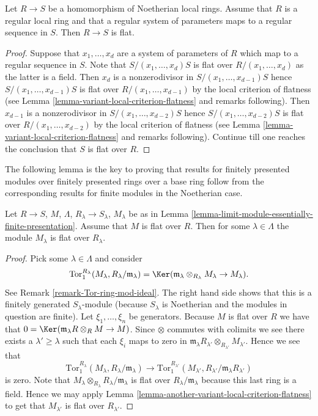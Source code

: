 \begin{lemma}
\label{lemma-flat-over-regular}
Let $R \to S$ be a homomorphism of Noetherian local rings.
Assume that $R$ is a regular local ring and that a regular system
of parameters maps to a regular sequence in $S$. Then $R \to S$
is flat.
\end{lemma}

\begin{proof}
Suppose that $x_1, \ldots, x_d$ are a system of parameters of $R$
which map to a regular sequence in $S$. Note that
$S/(x_1, \ldots, x_d)S$ is flat over $R/(x_1, \ldots, x_d)$
as the latter is a field. Then $x_d$ is a nonzerodivisor in
$S/(x_1, \ldots, x_{d - 1})S$ hence $S/(x_1, \ldots, x_{d - 1})S$
is flat over $R/(x_1, \ldots, x_{d - 1})$ by the local criterion
of flatness (see Lemma \ref{lemma-variant-local-criterion-flatness}
and remarks following). Then $x_{d - 1}$ is a nonzerodivisor in
$S/(x_1, \ldots, x_{d - 2})S$ hence $S/(x_1, \ldots, x_{d - 2})S$
is flat over $R/(x_1, \ldots, x_{d - 2})$ by the local criterion
of flatness (see Lemma \ref{lemma-variant-local-criterion-flatness}
and remarks following). Continue till one reaches the conclusion
that $S$ is flat over $R$.
\end{proof}

\noindent
The following lemma is the key to proving that results for finitely presented
modules over finitely presented rings over a base ring follow from the
corresponding results for finite modules in the Noetherian case.

\begin{lemma}
\label{lemma-colimit-eventually-flat}
Let $R \to S$, $M$, $\Lambda$, $R_\lambda \to S_\lambda$, $M_\lambda$
be as in Lemma \ref{lemma-limit-module-essentially-finite-presentation}.
Assume that $M$ is flat over $R$.
Then for some $\lambda \in \Lambda$ the module
$M_\lambda$ is flat over $R_\lambda$.
\end{lemma}

\begin{proof}
Pick some $\lambda \in \Lambda$ and consider
$$
\text{Tor}_1^{R_\lambda}(M_\lambda, R_\lambda/\mathfrak m_\lambda)
=
\Ker(\mathfrak m_\lambda \otimes_{R_\lambda} M_\lambda
\to M_\lambda).
$$
See Remark \ref{remark-Tor-ring-mod-ideal}. The right hand side
shows that this is a finitely generated $S_\lambda$-module (because
$S_\lambda$ is Noetherian and the modules in question are finite).
Let $\xi_1, \ldots, \xi_n$ be generators.
Because $M$ is flat over $R$ we
have that $0 = \Ker(\mathfrak m_\lambda R \otimes_R M \to M)$.
Since $\otimes$ commutes with colimits we see there exists
a $\lambda' \geq \lambda$ such that each $\xi_i$ maps to
zero in
$\mathfrak m_{\lambda}R_{\lambda'} \otimes_{R_{\lambda'}} M_{\lambda'}$.
Hence we see that
$$
\text{Tor}_1^{R_\lambda}(M_\lambda, R_\lambda/\mathfrak m_\lambda)
\longrightarrow
\text{Tor}_1^{R_{\lambda'}}(M_{\lambda'},
R_{\lambda'}/\mathfrak m_{\lambda}R_{\lambda'})
$$
is zero. Note that
$M_\lambda \otimes_{R_\lambda} R_\lambda/\mathfrak m_\lambda$
is flat over $R_\lambda/\mathfrak m_\lambda$ because this last
ring is a field. Hence we may apply Lemma
\ref{lemma-another-variant-local-criterion-flatness}
to get that $M_{\lambda'}$ is flat over $R_{\lambda'}$.
\end{proof}

